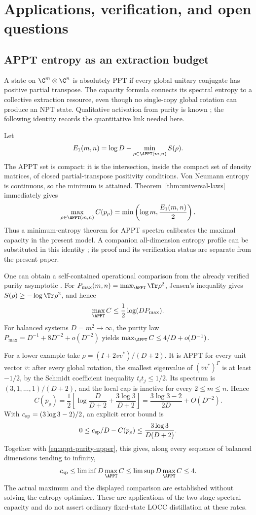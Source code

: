 \section{Applications, verification, and open questions}\label{sec:applications}

\subsection{APPT entropy as an extraction budget}
A state on $\C^m\otimes\C^n$ is absolutely PPT if every global unitary conjugate has positive partial transpose. The capacity formula connects its spectral entropy to a collective extraction resource, even though no single-copy global rotation can produce an NPT state. Qualitative activation from purity is known \cite{kondra}; the following identity records the quantitative link needed here.

Let
\[
 E_1(m,n)=\log D-\min_{\rho\in\APPT(m,n)}S(\rho).
\]
The APPT set is compact: it is the intersection, inside the compact set of density matrices, of closed partial-transpose positivity conditions. Von Neumann entropy is continuous, so the minimum is attained. Theorem~\ref{thm:universal-laws} immediately gives
\begin{equation}\label{eq:appt-capacity}
 \max_{\rho\in\APPT(m,n)}C(p_\rho)
 =\min\left(\log m,\frac{E_1(m,n)}2\right).
\end{equation}
Thus a minimum-entropy theorem for APPT spectra calibrates the maximal capacity in the present model. A companion all-dimension entropy profile can be substituted in this identity \cite{zhang-appt-entropy}; its proof and its verification status are separate from the present paper.

One can obtain a self-contained operational comparison from the already verified purity asymptotic \cite{zhang-appt-purity}. For $P_{\max}(m,n)=\max_{\APPT}\Tr\rho^2$, Jensen's inequality gives $S(\rho)\ge-\log\Tr\rho^2$, and hence
\begin{equation}\label{eq:appt-purity-upper}
 \max_{\APPT}C\le\frac12\log(DP_{\max}).
\end{equation}
For balanced systems $D=m^2\to\infty$, the purity law $P_{\max}=D^{-1}+8D^{-2}+o(D^{-2})$ yields $\max_{\APPT}C\le4/D+o(D^{-1})$.

For a lower example take $\rho=(I+2vv^*)/(D+2)$. It is APPT for every unit vector $v$: after every global rotation, the smallest eigenvalue of $(vv^*)^\Gamma$ is at least $-1/2$, by the Schmidt coefficient inequality $t_it_j\le1/2$. Its spectrum is $(3,1,\ldots,1)/(D+2)$, and the local cap is inactive for every $2\le m\le n$. Hence
\[
 C(p_\rho)=\frac12\left[\log\frac D{D+2}+\frac{3\log3}{D+2}\right]
 =\frac{3\log3-2}{2D}+O(D^{-2}).
\]
With $c_{\rm sp}=(3\log3-2)/2$, an explicit error bound is
\[
 0\le c_{\rm sp}/D-C(p_\rho)\le\frac{3\log3}{D(D+2)}.
\]
Together with \eqref{eq:appt-purity-upper}, this gives, along every sequence of balanced dimensions tending to infinity,
\[
 c_{\rm sp}\le\liminf D\max_{\APPT}C
 \le\limsup D\max_{\APPT}C\le4.
\]
The actual maximum and the displayed comparison are established without solving the entropy optimizer. These are applications of the two-stage spectral capacity and do not assert ordinary fixed-state LOCC distillation at these rates.

